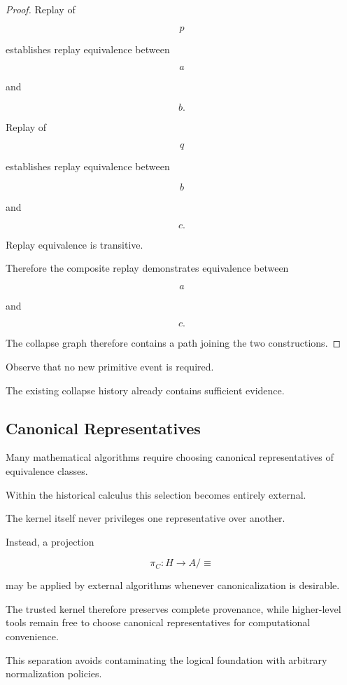 \documentclass[12pt,oneside]{article}
\theoremstyle{definition}
\theoremstyle{remark}
\begin{document}
\begin{proof}

Replay of

\[
p
\]

establishes replay equivalence between

\[
a
\]

and

\[
b.
\]

Replay of

\[
q
\]

establishes replay equivalence between

\[
b
\]

and

\[
c.
\]

Replay equivalence is transitive.

Therefore the composite replay demonstrates equivalence between

\[
a
\]

and

\[
c.
\]

The collapse graph therefore contains a path joining the two constructions.

\end{proof}

Observe that no new primitive event is required.

The existing collapse history already contains sufficient evidence.

\subsection{Canonical Representatives}

Many mathematical algorithms require choosing canonical representatives of
equivalence classes.

Within the historical calculus this selection becomes entirely external.

The kernel itself never privileges one representative over another.

Instead, a projection

\[
\pi_C
:
H
\rightarrow
A/{\!\!\equiv}
\]

may be applied by external algorithms whenever canonicalization is desirable.

The trusted kernel therefore preserves complete provenance, while higher-level
tools remain free to choose canonical representatives for computational
convenience.

This separation avoids contaminating the logical foundation with arbitrary
normalization policies.
\end{document}
